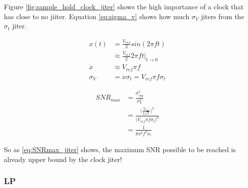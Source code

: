 Figure \ref{fig:sample_hold_clock_jiter} shows the high importance of a clock that has close to no jiiter.
Equation \ref{eq:sigma_v} shows how much $\sigma_V$ jiters from the $\sigma_t$ jiter.

\begin{align}
    x(t) &= \frac{V_{ref}}{2}sin(2\pi ft) \\
    &\approx \frac{V_{ref}}{2}2\pi ft\Big|_{t\to 0} \\
    \dot{x} &\approx V_{ref}\pi f \\
    \sigma_V &=\dot{x}\sigma_t = V_{ref}\pi f\sigma_t
    \label{eq:sigma_v}
\end{align}

\begin{align}
    SNR_{max} &= \frac{\sigma_{sig}^2}{\sigma_V^2} \\
    &= \frac{\Big(\frac{V_{ref}}{2\sqrt{2}}\Big)^2}{\Big(V_{ref}\pi f\sigma_t\Big)^2} \\
    &= \frac{1}{8\pi^2f^2\sigma_t}
    \label{eq:SNRmax_jiter}
\end{align}

So as \ref{eq:SNRmax_jiter} shows, the maximum SNR possible to be reached is already upper bound by the clock jiter!

\subsubsection[chain56LP]{ LP}